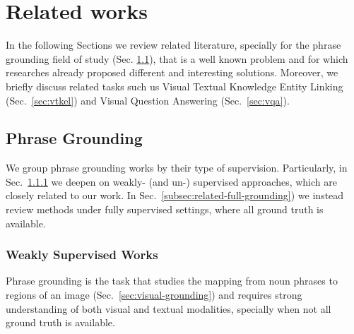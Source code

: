 
\chapter{Related works}

In the following Sections we review related literature, specially for
the phrase grounding field of study (Sec.
\ref{sec:related-grounding}), that is a well known problem and for
which researches already proposed different and interesting solutions.
Moreover, we briefly discuss related tasks such us Visual Textual
Knowledge Entity Linking (Sec.~\ref{sec:vtkel}) and Visual Question
Answering (Sec.~\ref{sec:vqa}).

\section{Phrase Grounding}
\label{sec:related-grounding}

We group phrase grounding works by their type of supervision.
Particularly, in Sec.~\ref{subsec:related-weak-grounding} we deepen on
weakly- (and un-) supervised approaches, which are closely related to
our work. In Sec.~\ref{subsec:related-full-grounding}) we instead
review methods under fully supervised settings, where all ground truth
is available.

\subsection{Weakly Supervised Works}
\label{subsec:related-weak-grounding}

Phrase grounding is the task that studies the mapping from noun
phrases to regions of an image (Sec.~\ref{sec:visual-grounding}) and
requires strong understanding of both visual and textual modalities,
specially when not all ground truth is available. 

